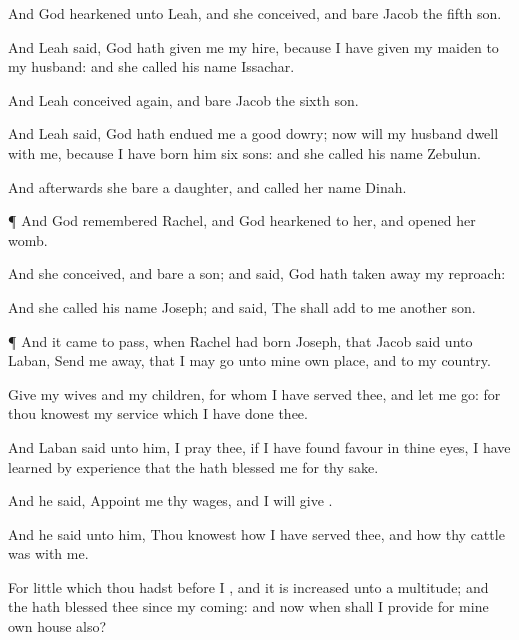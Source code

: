 {And
God
hearkened unto
Leah, and she
conceived, and
bare
Jacob the
fifth
son.

And
Leah
said,
God hath
given me my
hire,
because I have
given my
maiden to my
husband: and she
called his
name
Issachar.

And
Leah
conceived again, and
bare
Jacob the
sixth
son.

And
Leah
said,
God hath
endued me
{} a
good
dowry;
now will my
husband
dwell with me, because I have
born him
six
sons: and she
called his
name
Zebulun.

And
afterwards she
bare a
daughter, and
called her
name
Dinah.


\par }{\PP {}¶ And
God
remembered
Rachel, and
God
hearkened to her, and
opened her
womb.

And she
conceived, and
bare a
son; and
said,
God hath taken
away my
reproach:

And she
called his
name
Joseph; and
said, The
{} shall
add to me
another
son.


\par }{\PP {}¶ And it came to pass, when
Rachel had
born
Joseph, that
Jacob
said unto
Laban, Send me
away, that I may
go unto mine own
place, and to my
country.

Give
{} my
wives and my
children,
for whom I have
served thee, and let me
go: for thou
knowest my
service which I have
done thee.

And
Laban
said unto him, I pray thee, if I have
found
favour in thine
eyes,
{} I have learned by
experience that the
{} hath
blessed me for thy
sake.

And he
said,
Appoint me thy
wages, and I will
give
{}.

And he
said unto him, Thou
knowest
how I have
served thee, and
how thy
cattle was with me.

For
{}
little which thou hadst before
I
{}, and it is
{}
increased unto a
multitude; and the
{} hath
blessed thee since my
coming: and now
when shall I
provide for mine own
house also?

}

